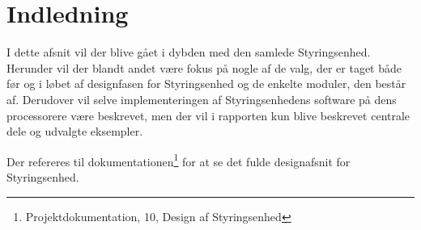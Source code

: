 
\section{Indledning}

I dette afsnit vil der blive gået i dybden med den samlede Styringsenhed. Herunder vil der blandt andet være fokus på nogle af de valg, der er taget både før og i løbet af designfasen for Styringsenhed og de enkelte moduler, den består af. Derudover vil selve implementeringen af Styringsenhedens software på dens processorere være beskrevet, men der vil i rapporten kun blive beskrevet centrale dele og udvalgte eksempler.



Der refereres til dokumentationen\footnote{Projektdokumentation, 10, Design af Styringsenhed} for at se det fulde designafsnit for Styringsenhed.

